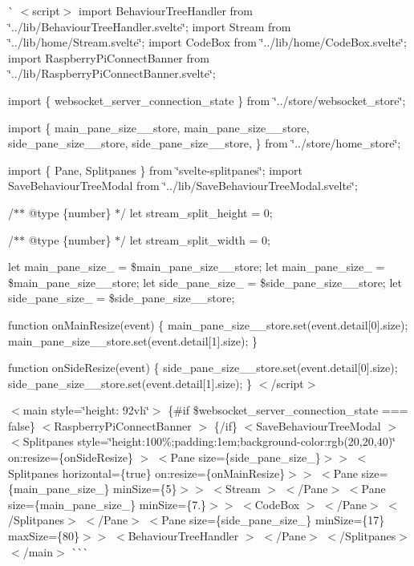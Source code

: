 \`{} $<$script$>$ import Behaviour\+Tree\+Handler from \char`\"{}../lib/\+Behaviour\+Tree\+Handler.\+svelte\char`\"{}; import Stream from \char`\"{}../lib/home/\+Stream.\+svelte\char`\"{}; import Code\+Box from \char`\"{}../lib/home/\+Code\+Box.\+svelte\char`\"{}; import Raspberry\+Pi\+Connect\+Banner from \char`\"{}../lib/\+Raspberry\+Pi\+Connect\+Banner.\+svelte\char`\"{};

import \{ websocket\+\_\+server\+\_\+connection\+\_\+state \} from \char`\"{}../store/websocket\+\_\+store\char`\"{};

import \{ main\+\_\+pane\+\_\+size\+\_\+\_\+store, main\+\_\+pane\+\_\+size\+\_\+\_\+store, side\+\_\+pane\+\_\+size\+\_\+\_\+store, side\+\_\+pane\+\_\+size\+\_\+\_\+store, \} from \char`\"{}../store/home\+\_\+store\char`\"{};

import \{ Pane, Splitpanes \} from \char`\"{}svelte-\/splitpanes\char`\"{}; import Save\+Behaviour\+Tree\+Modal from \char`\"{}../lib/\+Save\+Behaviour\+Tree\+Modal.\+svelte\char`\"{};

/$\ast$$\ast$ @type \{number\} $\ast$/ let stream\+\_\+split\+\_\+height = 0;

/$\ast$$\ast$ @type \{number\} $\ast$/ let stream\+\_\+split\+\_\+width = 0;

let main\+\_\+pane\+\_\+size\+\_ = \$main\+\_\+pane\+\_\+size\+\_\+\_\+store; let main\+\_\+pane\+\_\+size\+\_ = \$main\+\_\+pane\+\_\+size\+\_\+\_\+store; let side\+\_\+pane\+\_\+size\+\_ = \$side\+\_\+pane\+\_\+size\+\_\+\_\+store; let side\+\_\+pane\+\_\+size\+\_ = \$side\+\_\+pane\+\_\+size\+\_\+\_\+store;

function on\+Main\+Resize(event) \{ main\+\_\+pane\+\_\+size\+\_\+\_\+store.\+set(event.\+detail\mbox{[}0\mbox{]}.size); main\+\_\+pane\+\_\+size\+\_\+\_\+store.\+set(event.\+detail\mbox{[}1\mbox{]}.size); \}

function on\+Side\+Resize(event) \{ side\+\_\+pane\+\_\+size\+\_\+\_\+store.\+set(event.\+detail\mbox{[}0\mbox{]}.size); side\+\_\+pane\+\_\+size\+\_\+\_\+store.\+set(event.\+detail\mbox{[}1\mbox{]}.size); \} $<$/script$>$

$<$main style=\char`\"{}height\+: 92vh\char`\"{}$>$ \{\#if \$websocket\+\_\+server\+\_\+connection\+\_\+state === false\} $<$\+Raspberry\+Pi\+Connect\+Banner $>$ \{/if\} $<$\+Save\+Behaviour\+Tree\+Modal $>$ $<$\+Splitpanes         style=\char`\"{}height\+:100\%;padding\+:1em;background-\/color\+:rgb(20,20,40)\char`\"{}         on\+:resize=\{on\+Side\+Resize\}     $>$ $<$\+Pane size=\{side\+\_\+pane\+\_\+size\+\_\}$>$$>$ $<$\+Splitpanes horizontal=\{true\} on\+:resize=\{on\+Main\+Resize\}$>$$>$ $<$\+Pane size=\{main\+\_\+pane\+\_\+size\+\_\} min\+Size=\{5\}$>$$>$  $<$\+Stream $>$  $<$/\+Pane$>$ $<$\+Pane size=\{main\+\_\+pane\+\_\+size\+\_\} min\+Size=\{7.\}$>$$>$  $<$\+Code\+Box $>$  $<$/\+Pane$>$ $<$/\+Splitpanes$>$ $<$/\+Pane$>$ $<$\+Pane size=\{side\+\_\+pane\+\_\+size\+\_\} min\+Size=\{17\} max\+Size=\{80\}$>$$>$ $<$\+Behaviour\+Tree\+Handler $>$ $<$/\+Pane$>$ $<$/\+Splitpanes$>$ $<$/main$>$ \`{}\`{}\`{} 